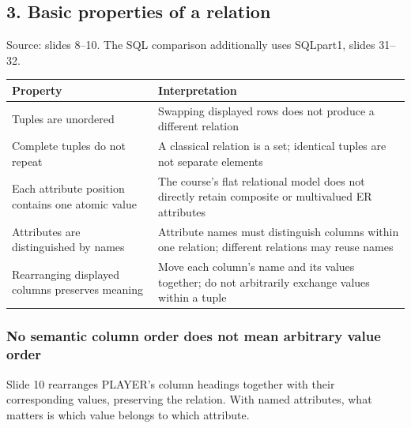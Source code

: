 \subsection{3. Basic properties of a relation}\label{03_relational_model_and_integrity_en-basic-properties-of-a-relation}

Source: slides 8--10. The SQL comparison additionally uses SQLpart1, slides 31--32.

\begin{longtable}[]{@{}
  >{\raggedright\arraybackslash}p{}
  >{\raggedright\arraybackslash}p{}@{}}
\toprule\noalign{}
\begin{minipage}[b]{\linewidth}\raggedright
Property
\end{minipage} & \begin{minipage}[b]{\linewidth}\raggedright
Interpretation
\end{minipage} \\
\midrule\noalign{}
\endhead
\bottomrule\noalign{}
\endlastfoot
Tuples are unordered & Swapping displayed rows does not produce a different relation \\
Complete tuples do not repeat & A classical relation is a set; identical tuples are not separate elements \\
Each attribute position contains one atomic value & The course's flat relational model does not directly retain composite or multivalued ER attributes \\
Attributes are distinguished by names & Attribute names must distinguish columns within one relation; different relations may reuse names \\
Rearranging displayed columns preserves meaning & Move each column's name and its values together; do not arbitrarily exchange values within a tuple \\
\end{longtable}

\subsubsection{No semantic column order does not mean arbitrary value order}\label{03_relational_model_and_integrity_en-no-semantic-column-order-does-not-mean-arbitrary-value-order}

Slide 10 rearranges PLAYER's column headings together with their corresponding values, preserving the relation. With named attributes, what matters is which value belongs to which attribute.

